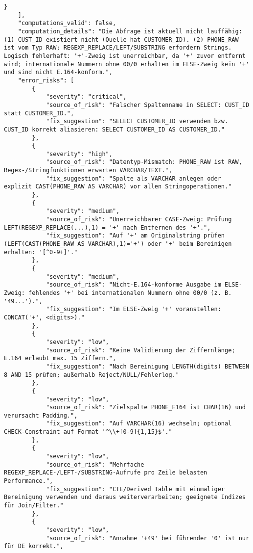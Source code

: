 \begin{lstlisting}[caption={Ausgabe: GPT-5 Anwendungsfall 3 Hauptdurchlauf},label={gpt_case3_prompt1}]
        }
    ],
    "computations_valid": false,
    "computation_details": "Die Abfrage ist aktuell nicht lauffähig: (1) CUST_ID existiert nicht (Quelle hat CUSTOMER_ID). (2) PHONE_RAW ist vom Typ RAW; REGEXP_REPLACE/LEFT/SUBSTRING erfordern Strings. Logisch fehlerhaft: '+'-Zweig ist unerreichbar, da '+' zuvor entfernt wird; internationale Nummern ohne 00/0 erhalten im ELSE-Zweig kein '+' und sind nicht E.164-konform.",
    "error_risks": [
        {
            "severity": "critical",
            "source_of_risk": "Falscher Spaltenname in SELECT: CUST_ID statt CUSTOMER_ID.",
            "fix_suggestion": "SELECT CUSTOMER_ID verwenden bzw. CUST_ID korrekt aliasieren: SELECT CUSTOMER_ID AS CUSTOMER_ID."
        },
        {
            "severity": "high",
            "source_of_risk": "Datentyp-Mismatch: PHONE_RAW ist RAW, Regex-/Stringfunktionen erwarten VARCHAR/TEXT.",
            "fix_suggestion": "Spalte als VARCHAR anlegen oder explizit CAST(PHONE_RAW AS VARCHAR) vor allen Stringoperationen."
        },
        {
            "severity": "medium",
            "source_of_risk": "Unerreichbarer CASE-Zweig: Prüfung LEFT(REGEXP_REPLACE(...),1) = '+' nach Entfernen des '+'.",
            "fix_suggestion": "Auf '+' am Originalstring prüfen (LEFT(CAST(PHONE_RAW AS VARCHAR),1)='+') oder '+' beim Bereinigen erhalten: '[^0-9+]'."
        },
        {
            "severity": "medium",
            "source_of_risk": "Nicht-E.164-konforme Ausgabe im ELSE-Zweig: fehlendes '+' bei internationalen Nummern ohne 00/0 (z. B. '49...').",
            "fix_suggestion": "Im ELSE-Zweig '+' voranstellen: CONCAT('+', <digits>)."
        },
        {
            "severity": "low",
            "source_of_risk": "Keine Validierung der Ziffernlänge; E.164 erlaubt max. 15 Ziffern.",
            "fix_suggestion": "Nach Bereinigung LENGTH(digits) BETWEEN 8 AND 15 prüfen; außerhalb Reject/NULL/Fehlerlog."
        },
        {
            "severity": "low",
            "source_of_risk": "Zielspalte PHONE_E164 ist CHAR(16) und verursacht Padding.",
            "fix_suggestion": "Auf VARCHAR(16) wechseln; optional CHECK-Constraint auf Format '^\\+[0-9]{1,15}$'."
        },
        {
            "severity": "low",
            "source_of_risk": "Mehrfache REGEXP_REPLACE-/LEFT-/SUBSTRING-Aufrufe pro Zeile belasten Performance.",
            "fix_suggestion": "CTE/Derived Table mit einmaliger Bereinigung verwenden und daraus weiterverarbeiten; geeignete Indizes für Join/Filter."
        },
        {
            "severity": "low",
            "source_of_risk": "Annahme '+49' bei führender '0' ist nur für DE korrekt.",

\end{lstlisting}
